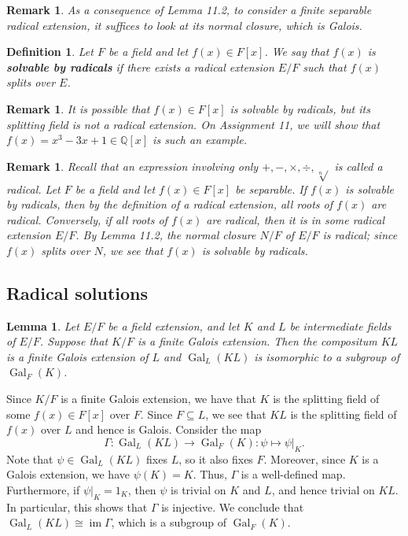 \documentclass[10pt]{article}
\makeatletter
\newcommand{\Q}{\mathbb{Q}}
\DeclareMathOperator{\im}{im}
\DeclareMathOperator{\Gal}{Gal}
\theoremstyle{newstyle}
\newtheorem{lemma}[thm]{Lemma}
\newtheorem{remark}[thm]{Remark}
\newtheorem{defn}[thm]{Definition}
\newenvironment{pf}[1][\proofname]{\par
  \pushQED{\qed}%
  \normalfont \topsep0\p@\relax
  \trivlist
  \item[\hskip\labelsep\scshape
  #1\@addpunct{.}]\ignorespaces
}{%
  \popQED\endtrivlist\@endpefalse
}
\makeatother
\begin{document}
\begin{remark}
As a consequence of Lemma 11.2, to consider a finite separable radical extension, it suffices to 
look at its normal closure, which is Galois. 
\end{remark}

\begin{defn}
Let $F$ be a field and let $f(x) \in F[x]$. We say that $f(x)$ is {\bf solvable by radicals} 
if there exists a radical extension $E/F$ such that $f(x)$ splits over $E$. 
\end{defn}

\begin{remark}
It is possible that $f(x) \in F[x]$ is solvable by radicals, but its splitting field is not a 
radical extension. On Assignment 11, we will show that $f(x) = x^3 - 3x + 1 \in \Q[x]$ is such 
an example. 
\end{remark}

\begin{remark}
Recall that an expression involving only $+, -, \times, \div, \sqrt[n]{}$ is called a radical. 
Let $F$ be a field and let $f(x) \in F[x]$ be separable. If $f(x)$ is solvable by radicals, 
then by the definition of a radical extension, all roots of $f(x)$ are radical. Conversely, if 
all roots of $f(x)$ are radical, then it is in some radical extension $E/F$. By Lemma 11.2, 
the normal closure $N/F$ of $E/F$ is radical; since $f(x)$ splits over $N$, we see that 
$f(x)$ is solvable by radicals. 
\end{remark}

\subsection{Radical solutions}

\begin{lemma}
Let $E/F$ be a field extension, and let $K$ and $L$ be intermediate fields of $E/F$. 
Suppose that $K/F$ is a finite Galois extension. Then the compositum $KL$ is a finite
Galois extension of $L$ and $\Gal_L(KL)$ is isomorphic to a subgroup of $\Gal_F(K)$. 
\end{lemma}
\begin{pf}
Since $K/F$ is a finite Galois extension, we have that $K$ is the splitting field of some 
$f(x) \in F[x]$ over $F$. Since $F \subseteq L$, we see that $KL$ is the splitting field of 
$f(x)$ over $L$ and hence is Galois. Consider the map 
\[ \Gamma : \Gal_L(KL) \to \Gal_F(K) : \psi \mapsto \psi|_K. \] 
Note that $\psi \in \Gal_L(KL)$ fixes $L$, so it also fixes $F$. Moreover, since $K$ is a Galois 
extension, we have $\psi(K) = K$. Thus, $\Gamma$ is a well-defined map. Furthermore, if 
$\psi|_K = 1_K$, then $\psi$ is trivial on $K$ and $L$, and hence trivial on $KL$. In particular, 
this shows that $\Gamma$ is injective. We conclude that $\Gal_L(KL) \cong \im\Gamma$, which is a subgroup 
of $\Gal_F(K)$. 
\end{pf}
\end{document}
